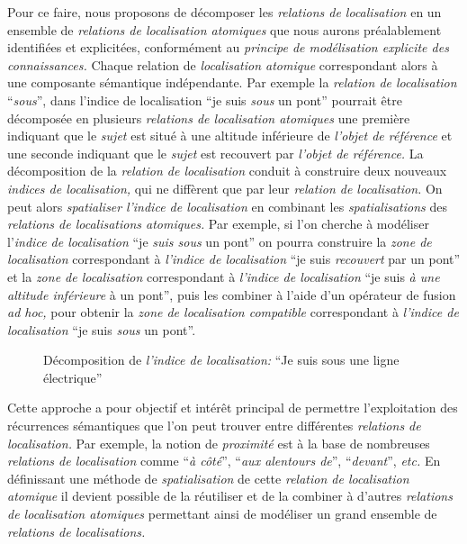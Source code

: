 Pour ce faire, nous proposons de décomposer les \emph{relations de
  localisation} en un ensemble de \emph{relations de localisation
  atomiques} que nous aurons préalablement identifiées et explicitées,
conformément au \emph{principe de modélisation explicite des
  connaissances.} Chaque relation de \emph{localisation atomique}
correspondant alors à une composante sémantique indépendante. Par
exemple la \emph{relation de localisation} \enquote{\emph{sous}}, dans
l'indice de localisation \enquote{je suis \emph{sous} un pont}
pourrait être décomposée en plusieurs \emph{relations de localisation
  atomiques} une première indiquant que le \emph{sujet} est situé à
une altitude inférieure de \emph{l'objet de référence} et une seconde
indiquant que le \emph{sujet} est recouvert par \emph{l'objet de
  référence.} La décomposition de la \emph{relation de localisation}
conduit à construire deux nouveaux \emph{indices de localisation,} qui
ne diffèrent que par leur \emph{relation de localisation.} On peut
alors \emph{spatialiser} \emph{l'indice de localisation} en combinant
les \emph{spatialisations} des \emph{relations de localisations
  atomiques.} Par exemple, si l'on cherche à modéliser l'\emph{indice
  de localisation} \enquote{je \emph{suis sous} un pont} on pourra
construire la \emph{zone de localisation} correspondant à
\emph{l'indice de localisation} \enquote{je suis \emph{recouvert} par
  un pont} et la \emph{zone de localisation} correspondant à
\emph{l'indice de localisation} \enquote{je suis \emph{à une altitude
    inférieure} à un pont}, puis les combiner à l'aide d'un opérateur
de fusion \emph{ad hoc,} pour obtenir la \emph{zone de localisation
  compatible} correspondant à \emph{l'indice de localisation}
\enquote{je suis \emph{sous} un pont}.

\begin{figure}
  \centering
  \caption[Illustration de la décomposition d'un \emph{indice de
    localisation}]{Décomposition de \emph{l'indice de localisation:}
    \enquote{Je suis sous une ligne électrique}}
  \label{fig:dec_sous}
\end{figure}

Cette approche a pour objectif et intérêt principal de permettre
l'exploitation des récurrences sémantiques que l'on peut trouver entre
différentes \emph{relations de localisation.} Par exemple, la notion
de \emph{proximité} est à la base de nombreuses \emph{relations de
  localisation} comme \enquote{\emph{à côté}}, \enquote{\emph{aux
    alentours de}}, \enquote{\emph{devant}}, \emph{etc.} En
définissant une méthode de \emph{spatialisation} de cette
\emph{relation de localisation atomique} il devient possible de la
réutiliser et de la combiner à d'autres \emph{relations de
  localisation atomiques} permettant ainsi de modéliser un grand
ensemble de \emph{relations de localisations.}

